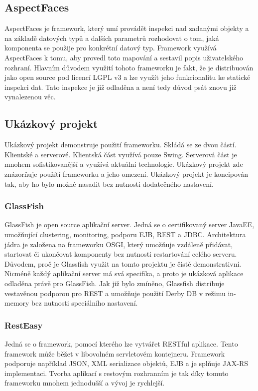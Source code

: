 \subsection{AspectFaces}
AspectFaces je framework, který umí provádět inspekci nad zadanými objekty a na základě datových typů a dalších parametrů rozhodovat o tom, jaká komponenta se použije pro konkrétní datový typ. Framework využívá AspectFaces k tomu, aby provedl toto mapování a sestavil popis uživatelského rozhraní. Hlavním důvodem využití tohoto frameworku je fakt, že je distribuován jako open source pod licencí LGPL v3 a lze využít jeho funkcionalitu ke statické inspekci dat. Tato inspekce je již odladěna a není tedy důvod psát znovu již vynalezenou věc. 
\subsection{Ukázkový projekt}
Ukázkový projekt demonstruje použití frameworku. Skládá se ze dvou částí. Klientské a serverové. Klientská část využívá pouze Swing. Serverová část je mnohem sofistikovanější a využívá aktuální technologie. Ukázkový projekt zde znázorňuje použítí frameworku a jeho omezení. Ukázkový projekt je koncipován tak, aby ho bylo možné nasadit bez nutnosti dodatečného nastavení.
\subsubsection{GlassFish}
GlassFish \cite{glassfish} je open source aplikační server. Jedná se o certifikovaný server JavaEE, umožňující clustering, monitoring, podporu EJB, REST a JDBC. Architektura jádra je založena na frameworku OSGI, který umožňuje vzdáleně přidávat, startovat či ukončovat komponenty bez nutnosti restartování celého serveru. Důvodem, proč je Glassfish využit na tomto projektu je čistě demonstrativní. Nicméně každý aplikační server má svá specifika, a proto je ukázková aplikace odladěna právě pro GlassFish. Jak již bylo zmíněno, Glassfish distribuje vestavěnou podporou pro REST a umožňuje použití Derby DB v režimu in-memory bez nutnosti speciálního nastavení.
\subsubsection{RestEasy}
Jedná se o framework, pomocí kterého lze vytvářet RESTful aplikace. Tento framework může běžet v libovolném servletovém kontejneru. Framework podporuje například JSON, XML serializace objektů, EJB a je splňuje JAX-RS implementaci. Tvorba aplikací s restovým rozhranním je tak díky tomuto frameworku mnohem jednodušší a vývoj je rychlejší. 
